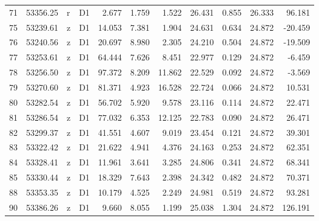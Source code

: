 \begin{tabular}{lrllrrrrrrr}
71 &  53356.25 &   r &    D1 &    2.677 &       1.759 &   1.522 &  26.431 &   0.855 &  26.333 &   96.181 \\
75 &  53239.61 &   z &    D1 &   14.053 &       7.381 &   1.904 &  24.631 &   0.634 &  24.872 &  -20.459 \\
76 &  53240.56 &   z &    D1 &   20.697 &       8.980 &   2.305 &  24.210 &   0.504 &  24.872 &  -19.509 \\
77 &  53253.61 &   z &    D1 &   64.444 &       7.626 &   8.451 &  22.977 &   0.129 &  24.872 &   -6.459 \\
78 &  53256.50 &   z &    D1 &   97.372 &       8.209 &  11.862 &  22.529 &   0.092 &  24.872 &   -3.569 \\
79 &  53270.60 &   z &    D1 &   81.371 &       4.923 &  16.528 &  22.724 &   0.066 &  24.872 &   10.531 \\
80 &  53282.54 &   z &    D1 &   56.702 &       5.920 &   9.578 &  23.116 &   0.114 &  24.872 &   22.471 \\
81 &  53286.54 &   z &    D1 &   77.032 &       6.353 &  12.125 &  22.783 &   0.090 &  24.872 &   26.471 \\
82 &  53299.37 &   z &    D1 &   41.551 &       4.607 &   9.019 &  23.454 &   0.121 &  24.872 &   39.301 \\
83 &  53322.42 &   z &    D1 &   21.622 &       4.941 &   4.376 &  24.163 &   0.253 &  24.872 &   62.351 \\
84 &  53328.41 &   z &    D1 &   11.961 &       3.641 &   3.285 &  24.806 &   0.341 &  24.872 &   68.341 \\
85 &  53330.44 &   z &    D1 &   18.329 &       7.643 &   2.398 &  24.342 &   0.482 &  24.872 &   70.371 \\
88 &  53353.35 &   z &    D1 &   10.179 &       4.525 &   2.249 &  24.981 &   0.519 &  24.872 &   93.281 \\
90 &  53386.26 &   z &    D1 &    9.660 &       8.055 &   1.199 &  25.038 &   1.304 &  24.872 &  126.191 \\
\bottomrule
\end{tabular}
